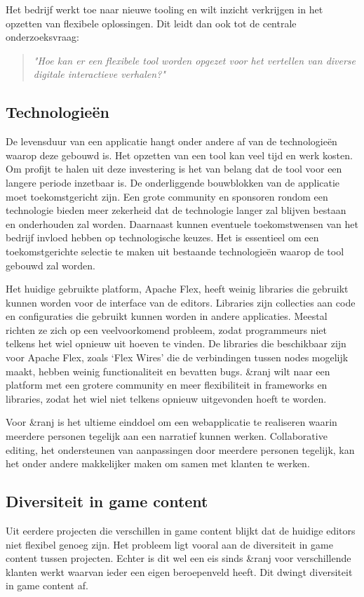 Het bedrijf werkt toe naar nieuwe tooling en wilt inzicht verkrijgen in het opzetten van flexibele oplossingen. Dit leidt dan ook tot de centrale onderzoeksvraag: 

\begin{quote} 
    \centering
    \large
    \textit{
        "Hoe kan er een flexibele tool worden opgezet voor het vertellen van diverse digitale interactieve verhalen?"
    }
\end{quote}

\subsection{Technologieën}
De levensduur van een applicatie hangt onder andere af van de technologieën waarop deze gebouwd is. Het opzetten van een tool kan veel tijd en werk kosten. Om profijt te halen uit deze investering is het van belang dat de tool voor een langere periode inzetbaar is. De onderliggende bouwblokken van de applicatie moet toekomstgericht zijn. Een grote community en sponsoren rondom een technologie bieden meer zekerheid dat de technologie langer zal blijven bestaan en onderhouden zal worden. Daarnaast kunnen eventuele toekomstwensen van het bedrijf invloed hebben op technologische keuzes. Het is essentieel om een toekomstgerichte selectie te maken uit bestaande technologieën waarop de tool gebouwd zal worden.

Het huidige gebruikte platform, Apache Flex, heeft weinig libraries die gebruikt kunnen worden voor de interface van de editors. Libraries zijn collecties aan code en configuraties die gebruikt kunnen worden in andere applicaties. Meestal richten ze zich op een veelvoorkomend probleem, zodat programmeurs niet telkens het wiel opnieuw uit hoeven te vinden. De libraries die beschikbaar zijn voor Apache Flex, zoals ‘Flex Wires’ die de verbindingen tussen nodes mogelijk maakt, hebben weinig functionaliteit en bevatten bugs. \&ranj wilt naar een platform met een grotere community en meer flexibiliteit in frameworks en libraries, zodat het wiel niet telkens opnieuw uitgevonden hoeft te worden.

Voor \&ranj is het ultieme einddoel om een webapplicatie te realiseren waarin meerdere personen tegelijk aan een narratief kunnen werken. Collaborative editing, het ondersteunen van aanpassingen door meerdere personen tegelijk, kan het onder andere makkelijker maken om samen met klanten te werken.

\subsection{Diversiteit in game content}
Uit eerdere projecten die verschillen in game content blijkt dat de huidige editors niet flexibel genoeg zijn. Het probleem ligt vooral aan de diversiteit in game content tussen projecten. Echter is dit wel een eis sinds \&ranj voor verschillende klanten werkt waarvan ieder een eigen beroepenveld heeft. Dit dwingt diversiteit in game content af.

